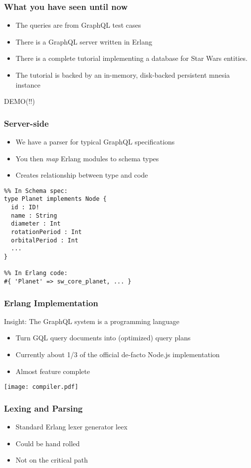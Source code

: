 \documentclass[lualatex]{beamer}
\begin{document}
\begin{frame}
  \frametitle{What you have seen until now}
  \begin{itemize}
  \item The queries are from GraphQL test cases
  \item There is a GraphQL server written in Erlang
  \item There is a complete tutorial implementing a database for Star
    Wars\texttrademark{} entities.
  \item The tutorial is backed by an in-memory, disk-backed persistent
    mnesia instance
  \end{itemize}
\end{frame}

\begin{frame}
  DEMO(!!)
\end{frame}

\begin{frame}[fragile]
  \frametitle{Server-side}
  \begin{itemize}
  \item We have a parser for typical GraphQL specifications
  \item You then \emph{map} Erlang modules to schema types
  \item Creates relationship between type and code
  \end{itemize}
\begin{verbatim}
%% In Schema spec:
type Planet implements Node {
  id : ID!
  name : String
  diameter : Int
  rotationPeriod : Int
  orbitalPeriod : Int
  ...
}

%% In Erlang code:
#{ 'Planet' => sw_core_planet, ... }
\end{verbatim}
\end{frame}

\begin{frame}
  \frametitle{Erlang Implementation}
  Insight: The GraphQL system is a programming language
  \begin{itemize}
  \item Turn GQL query documents into (optimized) query plans
  \item Currently about 1/3 of the official de-facto Node.js
    implementation
  \item Almost feature complete
  \end{itemize}
  \texttt{[image: compiler.pdf]}
\end{frame}

\begin{frame}
  \frametitle{Lexing and Parsing}
  \begin{itemize}
  \item Standard Erlang lexer generator leex
  \item Could be hand rolled
  \item Not on the critical path
  \end{itemize}
\end{frame}
\end{document}
